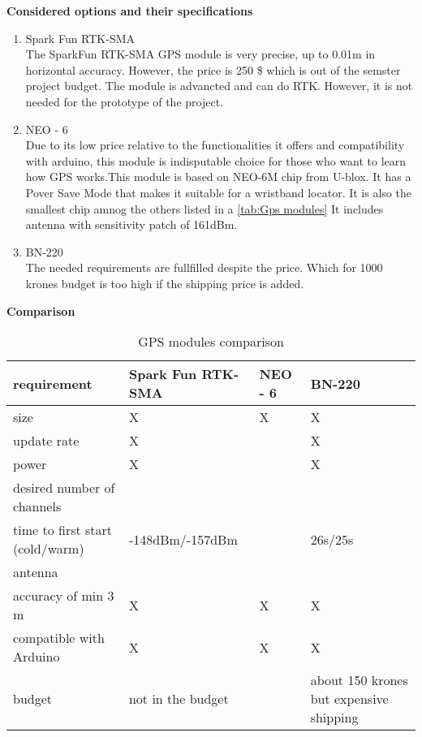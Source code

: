 \textbf{Considered options and their specifications}
\begin{enumerate}
    \item Spark Fun RTK-SMA\\
    The SparkFun RTK-SMA GPS module is very precise, up to 0.01m in horizontal accuracy. However,
    the price is 250 \$ which is out of the semster project budget. The module is advancted and can do RTK. 
    However, it is not needed for the prototype of the project.

       
    \item NEO - 6\\
    Due to its low price relative to the functionalities it offers and compatibility with arduino, 
    this module is indisputable choice for those who want to learn how GPS works.This module is based on NEO-6M chip from U-blox. 
    It has a Pover Save Mode that makes it suitable for a wristband locator. It is also the smallest chip amnog the others listed in a  \autoref{tab:Gps modules}
    It includes antenna with sensitivity patch of 161dBm.
    \item BN-220\\
    The needed requirements are fullfilled despite the price. Which for 1000 krones budget is too high if the shipping price is added.
\cite{1}



\end{enumerate}


\textbf{Comparison}
\begin{center}
    \begin{table}[H]
    \begin{tabularx}{0.8\textwidth}{
    | >{\centering\arraybackslash}X 
    | >{\centering\arraybackslash}X 
    | >{\centering\arraybackslash}X  
    | >{\centering\arraybackslash}X | }

    \hline
    requirement&Spark Fun RTK-SMA&NEO - 6&BN-220 \\
    \hline
    size&X&X&X\\
    \hline
    update rate&X&&X\\
    \hline
    power&X&&X\\
    \hline
    desired number of channels&&&72\\
    \hline
    time to first start (cold/warm)&-148dBm/-157dBm&&26s/25s\\
    \hline
    antenna&&&\\
    \hline
    accuracy of min 3 m&X&X&X\\
    \hline
    compatible with Arduino&X&X&X\\
    \hline
    budget&not in the budget&&about 150 krones but expensive shipping\\
    \hline
\end{tabularx}
 \caption{GPS modules comparison }
        \label{tab:Gps modules}
\end{table}
\end{center}

